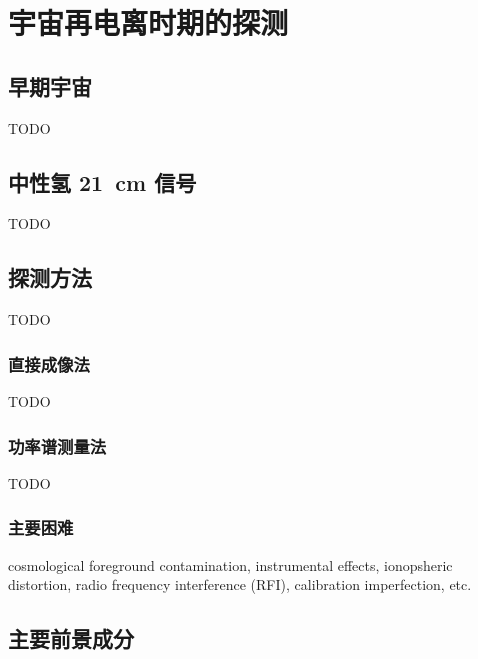 \chapter{宇宙再电离时期的探测}
\label{chap:detection}


\section{早期宇宙}
\label{sec:early-universe}

TODO


\section{中性氢 \SI{21}{\cm} 信号}
\label{sec:21cm-signal}

TODO


\section{探测方法}

TODO

\subsection{直接成像法}

TODO

\subsection{功率谱测量法}

TODO

\subsection{主要困难}

cosmological foreground contamination,
instrumental effects, ionopsheric distortion,
radio frequency interference (RFI),
calibration imperfection, etc.


\section{主要前景成分}

